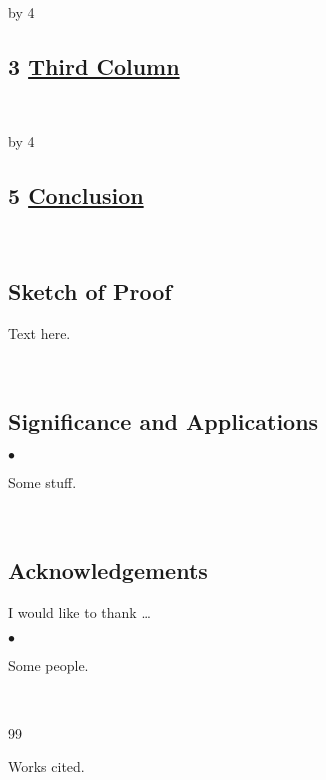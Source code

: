 \documentclass[12pt]{scrartcl}
\newenvironment{citemize}{
\begin{list}{$\bullet$}{\setlength{\itemsep}{0pt} \setlength{\rightmargin}{0pt} \setlength{\leftmargin}{0.5\labelwidth} \setlength{\topsep}{0pt}}
}{\end{list}}
\def\anzspalten{4}
\newlength{\kastenwidth}
\newenvironment{kasten}{%
  \begin{lrbox}{\dummybox}%
    \begin{minipage}{0.96\linewidth}}%
    {\end{minipage}%
  \end{lrbox}%
  \raisebox{-\depth}{\psshadowbox[framesep=1em]{\usebox{\dummybox}}}\\[0.5em]}
\newenvironment{spalte}{%
  \setlength\kastenwidth{1.2\textwidth}
  \divide\kastenwidth by \anzspalten
  \begin{minipage}[t]{\kastenwidth}}{\end{minipage}\hfill}
\begin{document}
\begin{lrbox}{\spalten}
{\begin{spalte}
\begin{kasten}
\section*{3 \hspace{0.1cm} {\color{red} 
\underline{Third Column}}}
\end{kasten}

\end{spalte}
    \begin{spalte}
\vspace{-2.8in}
\begin{kasten}
 \section*{5 \hspace{0.1cm} {\color{red} \underline{Conclusion
}}}
\end{kasten}

\begin{kasten}
\subsection*{{\color{blue} \large Sketch of Proof}}
Text here.
\end{kasten}

\begin{kasten}
  \subsection*{{\color{blue} \large Significance and Applications}}

\begin{citemize}
\item Some stuff.
\end{citemize}

\end{kasten}


\begin{kasten}
\subsection*{{\color{blue} Acknowledgements}}
I would like to thank \ldots
\begin{citemize}
\item Some people.
\end{citemize}
\end{kasten}

\begin{kasten}
         {\small
\begin{thebibliography}{99}
\setlength{\itemsep}{-2mm}

 Works cited.

\end{thebibliography}
} %
\end{kasten}

\end{spalte}
    }
    \end{lrbox}
\resizebox*{0.98\textwidth}{!}{%
  \usebox{\spalten}}\hfill\mbox{}\vfill
\end{document}
